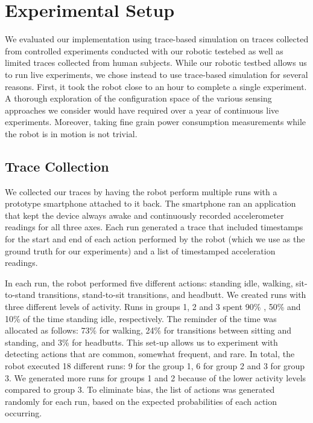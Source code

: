 \section{Experimental Setup}
\label{sec:experimentalSetup}

We evaluated our implementation using trace-based simulation on traces
collected from controlled experiments conducted with our robotic
testebed as well as limited traces collected from human subjects.
While our robotic testbed allows us to run live experiments, we chose
instead to use trace-based simulation for several reasons.  First, it
took the robot close to an hour to complete a single experiment.  A
thorough exploration of the configuration space of the various sensing
approaches we consider would have required over a year of continuous
live experiments.  Moreover, taking fine grain power consumption
measurements while the robot is in motion is not trivial.

\subsection{Trace Collection}

We collected our traces by having the robot perform multiple runs with
a prototype smartphone attached to it back.  The smartphone ran an
application that kept the device always awake and continuously recorded
accelerometer readings for all three axes.  Each run generated a
trace that included timestamps for the start and end of each action
performed by the robot (which we use as the ground truth for our
experiments) and a list of timestamped acceleration readings.

In each run, the robot performed five different actions: standing
idle, walking, sit-to-stand transitions, stand-to-sit transitions, and
headbutt.  We created runs with three different levels of activity.
Runs in groups 1, 2 and 3 spent 90\% , 50\% and 10\% of the time
standing idle, respectively. The reminder of the time was allocated as
follows: 73\% for walking, 24\% for transitions between sitting and
standing, and 3\% for headbutts.  This set-up allows us to experiment
with detecting actions that are common, somewhat frequent, and rare.
In total, the robot executed 18 different runs: 9 for the group 1, 6
for group 2 and 3 for group 3.  We generated more runs for groups 1
and 2 because of the lower activity levels compared to group 3. To
eliminate bias, the list of actions was generated randomly for each
run, based on the expected probabilities of each action occurring.

